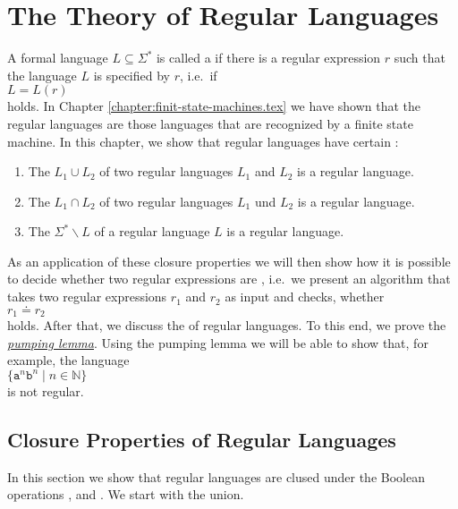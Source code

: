 \chapter{The Theory of Regular Languages \label{chapter:regulaere-sprachen}}
A formal language $L \subseteq \Sigma^*$ is called a  
if there is a regular expression $r$ such that the language $L$ is specified by $r$, i.e.~if
\\[0.2cm]
\hspace*{1.3cm}
$L = L(r)$ 
\\[0.2cm]
holds.  In Chapter \ref{chapter:finit-state-machines.tex} we have shown that the regular languages
are those languages that are recognized by a finite state machine.  In this chapter, we show
that regular languages have certain :
\begin{enumerate}
\item The  $L_1 \cup L_2$ of two regular languages $L_1$ and $L_2$ is a regular language.
\item The  $L_1 \cap L_2$ of two regular languages $L_1$ und $L_2$ is a regular language.
\item The   $\Sigma^* \backslash L$ of a regular language $L$ is a regular language.
\end{enumerate}
As an application of these closure properties we will then show how it is possible to decide whether two
regular expressions are , i.e.~we present an algorithm that takes two regular expressions
$r_1$ and $r_2$ as input and checks, whether 
\\[0.2cm]
\hspace*{1.3cm}
$r_1 \doteq r_2$
\\[0.2cm]
holds.  After that, we discuss the  of regular languages.  To this end, we prove the
\href{http://en.wikipedia.org/wiki/Pumping_lemma_for_regular_languages}{\emph{pumping lemma}}.
Using the pumping lemma we will be able to show that, for example, the language
\\[0.2cm]
\hspace*{1.3cm} $\{ \mathtt{a}^n \mathtt{b}^n \mid n \in \mathbb{N} \}$
\\[0.2cm]
is not regular.

\section{Closure Properties of Regular Languages}
In this section we show that regular languages are clused under the Boolean operations
,  and .  We start with the union.

